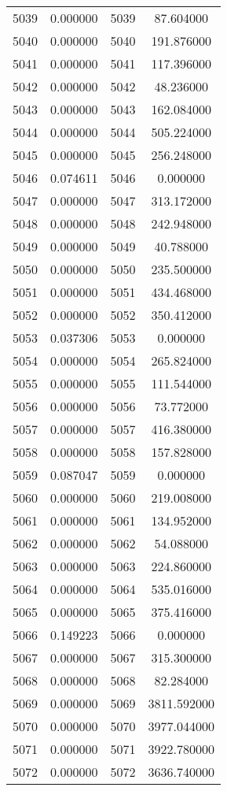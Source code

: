 \documentclass[12pt]{article}
\begin{document}
\begin{longtable}{@{}cccc@{}}
5039 & 0.000000 & 5039 & 87.604000 \\
5040 & 0.000000 & 5040 & 191.876000 \\
5041 & 0.000000 & 5041 & 117.396000 \\
5042 & 0.000000 & 5042 & 48.236000 \\
5043 & 0.000000 & 5043 & 162.084000 \\
5044 & 0.000000 & 5044 & 505.224000 \\
5045 & 0.000000 & 5045 & 256.248000 \\
5046 & 0.074611 & 5046 & 0.000000 \\
5047 & 0.000000 & 5047 & 313.172000 \\
5048 & 0.000000 & 5048 & 242.948000 \\
5049 & 0.000000 & 5049 & 40.788000 \\
5050 & 0.000000 & 5050 & 235.500000 \\
5051 & 0.000000 & 5051 & 434.468000 \\
5052 & 0.000000 & 5052 & 350.412000 \\
5053 & 0.037306 & 5053 & 0.000000 \\
5054 & 0.000000 & 5054 & 265.824000 \\
5055 & 0.000000 & 5055 & 111.544000 \\
5056 & 0.000000 & 5056 & 73.772000 \\
5057 & 0.000000 & 5057 & 416.380000 \\
5058 & 0.000000 & 5058 & 157.828000 \\
5059 & 0.087047 & 5059 & 0.000000 \\
5060 & 0.000000 & 5060 & 219.008000 \\
5061 & 0.000000 & 5061 & 134.952000 \\
5062 & 0.000000 & 5062 & 54.088000 \\
5063 & 0.000000 & 5063 & 224.860000 \\
5064 & 0.000000 & 5064 & 535.016000 \\
5065 & 0.000000 & 5065 & 375.416000 \\
5066 & 0.149223 & 5066 & 0.000000 \\
5067 & 0.000000 & 5067 & 315.300000 \\
5068 & 0.000000 & 5068 & 82.284000 \\
5069 & 0.000000 & 5069 & 3811.592000 \\
5070 & 0.000000 & 5070 & 3977.044000 \\
5071 & 0.000000 & 5071 & 3922.780000 \\
5072 & 0.000000 & 5072 & 3636.740000 \\

\end{longtable}
\end{document}
